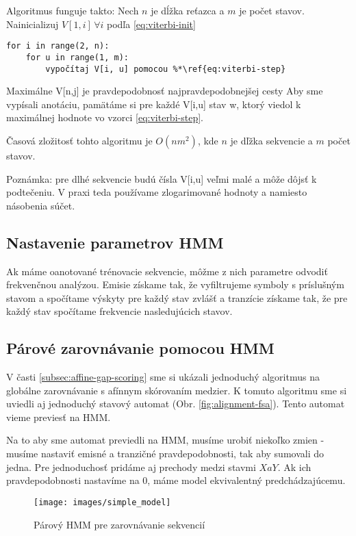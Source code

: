 Algoritmus funguje takto:
Nech $n$ je dĺžka reťazca a $m$ je počet stavov.
Nainicializuj $V[1,i]\, \forall i$ podľa \ref{eq:viterbi-init}

\begin{lstlisting}
for i in range(2, n):
    for u in range(1, m):
        vypočítaj V[i, u] pomocou %*\ref{eq:viterbi-step}
\end{lstlisting}
Maximálne V[n,j] je pravdepodobnosť najpravdepodobnejšej cesty
Aby sme vypísali anotáciu, pamätáme si pre každé V[i,u] stav w, ktorý viedol k maximálnej hodnote vo vzorci \ref{eq:viterbi-step}.

Časová zložitosť tohto algoritmu je $O(nm^2)$, kde $n$ je dľžka sekvencie a $m$ počet stavov.

Poznámka: pre dlhé sekvencie budú čísla V[i,u] veľmi malé a môže dôjsť k podtečeniu. V praxi teda používame zlogarimované hodnoty a namiesto násobenia súčet.

\subsection{Nastavenie parametrov HMM}
Ak máme oanotované trénovacie sekvencie, môžme z nich parametre odvodiť frekvenčnou analýzou. Emisie získame tak, že vyfiltrujeme symboly s príslušným stavom a spočítame výskyty pre každý stav zvlášť a tranzície získame tak, že pre každý stav spočítame frekvencie nasledujúcich stavov.

\subsection{Párové zarovnávanie pomocou HMM}
V časti \ref{subsec:affine-gap-scoring} sme si ukázali jednoduchý algoritmus na globálne zarovnávanie s afínnym skórovaním medzier. K tomuto algoritmu sme si uviedli aj jednoduchý stavový automat (Obr. \ref{fig:alignment-fsa}). Tento automat vieme previesť na HMM.

Na to aby sme automat previedli na HMM, musíme urobiť niekoľko zmien - musíme nastaviť emisné a tranzičné pravdepodobnosti, tak aby sumovali do jedna. Pre jednoduchosť pridáme aj prechody medzi stavmi $X a Y$. Ak ich pravdepodobnosti nastavíme na 0, máme model ekvivalentný predchádzajúcemu.

\begin{figure}[htp]
    \centering
    \texttt{[image: images/simple\_model]}
    \caption{Párový HMM pre zarovnávanie sekvencií}
    \label{fig:simple-model}
\end{figure}

